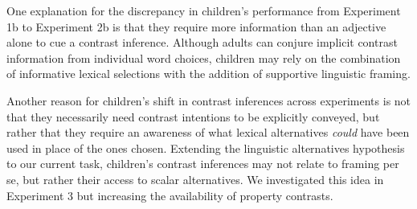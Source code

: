 \documentclass[10pt,letterpaper]{article}
\begin{document}



One explanation for the discrepancy in children's performance from Experiment 1b to Experiment 2b is that they require more information than an adjective alone to cue a contrast inference.  Although adults can conjure implicit contrast information from individual word choices, children may rely on the combination of informative lexical selections with the addition of supportive linguistic framing.  

Another reason for children's shift in contrast inferences across experiments is not that they necessarily need contrast intentions to be explicitly conveyed, but rather that they require an awareness of what lexical alternatives \emph{could} have been used in place of the ones chosen.  Extending the linguistic alternatives hypothesis to our current task, children's contrast inferences may not relate to framing per se, but rather their access to scalar alternatives.  We investigated this idea in Experiment 3 but increasing the availability of property contrasts. 


\end{document}
